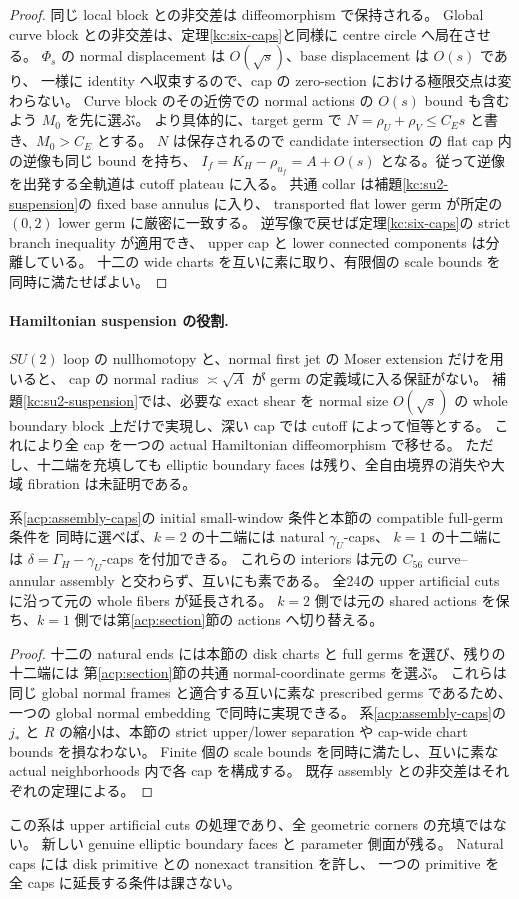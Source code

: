 \begin{proof}
同じ local block との非交差は diffeomorphism で保持される。
Global curve block との非交差は、定理\ref{kc:six-caps}と同様に centre circle へ局在させる。
$\Phi_s$ の normal displacement は $O(\sqrt s)$、base displacement は $O(s)$ であり、
一様に identity へ収束するので、cap の zero-section における極限交点は変わらない。
Curve block のその近傍での normal actions の $O(s)$ bound も含むよう $M_0$ を先に選ぶ。
より具体的に、target germ で $N=\rho_U+\rho_V\le C_Es$ と書き、$M_0>C_E$ とする。
$N$ は保存されるので candidate intersection の flat cap 内の逆像も同じ bound を持ち、
$I_f=K_H-\rho_{u_f}=A+O(s)$ となる。従って逆像を出発する全軌道は cutoff plateau に入る。
共通 collar は補題\ref{kc:su2-suspension}の fixed base annulus に入り、
transported flat lower germ が所定の $(0,2)$ lower germ に厳密に一致する。
逆写像で戻せば定理\ref{kc:six-caps}の strict branch inequality が適用でき、
upper cap と lower connected components は分離している。
十二の wide charts を互いに素に取り、有限個の scale bounds を同時に満たせばよい。
\end{proof}

\paragraph{Hamiltonian suspension の役割.}
$SU(2)$ loop の nullhomotopy と、normal first jet の Moser extension だけを用いると、
cap の normal radius $\asymp\sqrt A$ が germ の定義域に入る保証がない。
補題\ref{kc:su2-suspension}では、必要な exact shear を normal size $O(\sqrt s)$ の
whole boundary block 上だけで実現し、深い cap では cutoff によって恒等とする。
これにより全 cap を一つの actual Hamiltonian diffeomorphism で移せる。
ただし、十二端を充填しても elliptic boundary faces は残り、全自由境界の消失や大域 fibration は未証明である。


\begin{corollary}
\label{kc:mixed-caps}
系\ref{acp:assembly-caps}の initial small-window 条件と本節の compatible full-germ 条件を
同時に選べば、$k=2$ の十二端には natural $\gamma_U$-caps、
$k=1$ の十二端には $\delta=\Gamma_H-\gamma_U$-caps を付加できる。
これらの interiors は元の $C_{56}$ curve--annular assembly と交わらず、互いにも素である。
全24の upper artificial cuts に沿って元の whole fibers が延長される。
$k=2$ 側では元の shared actions を保ち、$k=1$ 側では第\ref{acp:section}節の actions へ切り替える。
\end{corollary}

\begin{proof}
十二の natural ends には本節の disk charts と full germs を選び、残りの十二端には
第\ref{acp:section}節の共通 normal-coordinate germs を選ぶ。
これらは同じ global normal frames と適合する互いに素な prescribed germs であるため、
一つの global normal embedding で同時に実現できる。
系\ref{acp:assembly-caps}の $j_*$ と $R$ の縮小は、本節の strict upper/lower separation や
cap-wide chart bounds を損なわない。
Finite 個の scale bounds を同時に満たし、互いに素な actual neighborhoods 内で各 cap を構成する。
既存 assembly との非交差はそれぞれの定理による。
\end{proof}

この系は upper artificial cuts の処理であり、全 geometric corners の充填ではない。
新しい genuine elliptic boundary faces と parameter 側面が残る。
Natural caps には disk primitive との nonexact transition を許し、
一つの primitive を全 caps に延長する条件は課さない。
